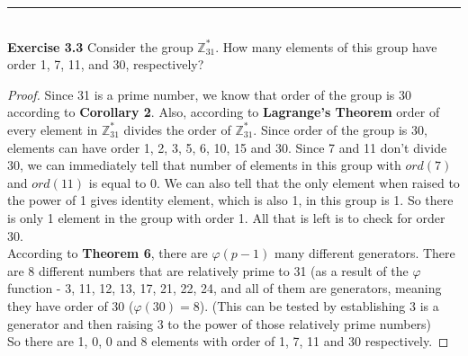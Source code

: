 \documentclass[a4paper]{article}
\begin{document}
\noindent\rule{12cm}{0.4pt}\\
\noindent \textbf{Exercise 3.3} Consider the group $\mathbb{Z}^{*}_{31}$. How many elements of this group have order 1, 7, 11, and 30, respectively?
\begin{proof}
Since 31 is a prime number, we know that order of the group is 30 according to \textbf{Corollary 2}. Also, according to \textbf{Lagrange's Theorem} order of every element in $\mathbb{Z}^{*}_{31}$ divides the order of $\mathbb{Z}^{*}_{31}$. Since order of the group is 30, elements can have order 1, 2, 3, 5, 6, 10, 15 and 30. Since 7 and 11 don't divide 30, we can immediately tell that number of elements in this group with $ord(7)$ and $ord(11)$ is equal to 0. We can also tell that the only element when raised to the power of 1 gives identity element, which is also 1, in this group is 1. So there is only 1 element in the group with order 1. All that is left is to check for order 30.\\
According to \textbf{Theorem 6}, there are $\varphi(p - 1)$ many different generators. There are 8 different numbers that are relatively prime to 31 (as a result of the $\varphi$ function - 3, 11, 12, 13, 17, 21, 22, 24, and all of them are generators, meaning they have order of 30 ($\varphi(30)=8$). (This can be tested by establishing 3 is a generator and then raising 3 to the power of those relatively prime numbers)\\
So there are 1, 0, 0 and 8 elements with order of 1, 7, 11 and 30 respectively.
\end{proof}
\end{document}

